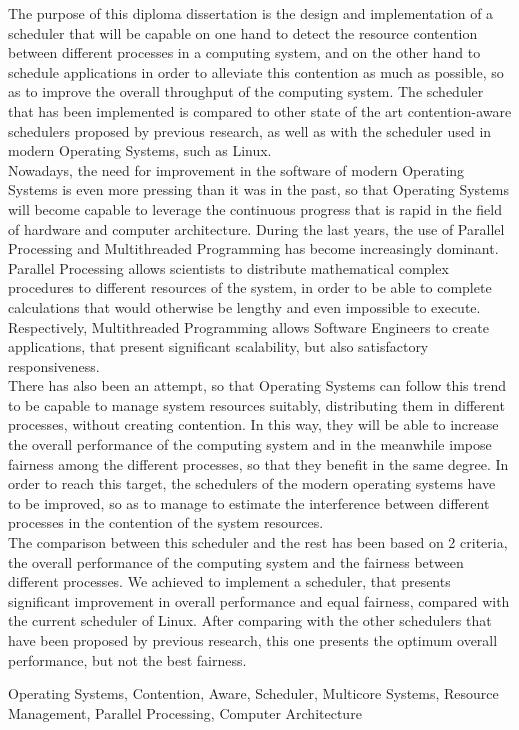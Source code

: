 \documentclass[diploma]{Styles/softlab-thesis}
\begin{document}
\begin{abstracten}%
{}

The purpose of this diploma dissertation is the design and implementation of a scheduler that will be capable on one hand to detect the resource contention between different processes in a computing system, and on the other hand to schedule applications in order to alleviate this contention as much as possible, so as to improve the overall throughput of the computing system. The scheduler that has been implemented is compared to other state of the art contention-aware schedulers proposed by previous research, as well as with the scheduler used in modern Operating Systems, such as Linux.\\


Nowadays, the need for improvement in the software of modern Operating Systems is even more pressing than it was in the past, so that Operating Systems will become capable to leverage the continuous progress that is rapid in the field of hardware and computer architecture. During the last years, the use of Parallel Processing and Multithreaded Programming has become increasingly dominant. Parallel Processing allows scientists to distribute mathematical complex procedures to different resources of the system, in order to be able to complete calculations that would otherwise be lengthy and even impossible to execute. Respectively, Multithreaded Programming allows Software Engineers to create applications, that present significant scalability, but also satisfactory responsiveness.\\


There has also been an attempt, so that Operating Systems can follow this trend to be capable to manage system resources suitably, distributing them in different processes, without creating contention. In this way, they will be able to increase the overall performance of the computing system and in the meanwhile impose fairness among the different processes, so that they benefit in the same degree. In order to reach this target, the schedulers of the modern operating systems have to be improved, so as to manage to estimate the interference between different processes in the contention of the system resources.\\


The comparison between this scheduler and the rest has been based on 2 criteria, the overall performance of the computing system and the fairness between different processes. We achieved to implement a scheduler, that presents significant improvement in overall performance and equal fairness, compared with the current scheduler of Linux. After comparing with the other schedulers that have been proposed by previous research, this one presents the optimum overall performance, but not the best fairness.\\


\begin{keywordsen}
Operating Systems, Contention, Aware, Scheduler, Multicore Systems, Resource Management, Parallel Processing, Computer Architecture
\end{keywordsen}
\end{abstracten}
\end{document}
